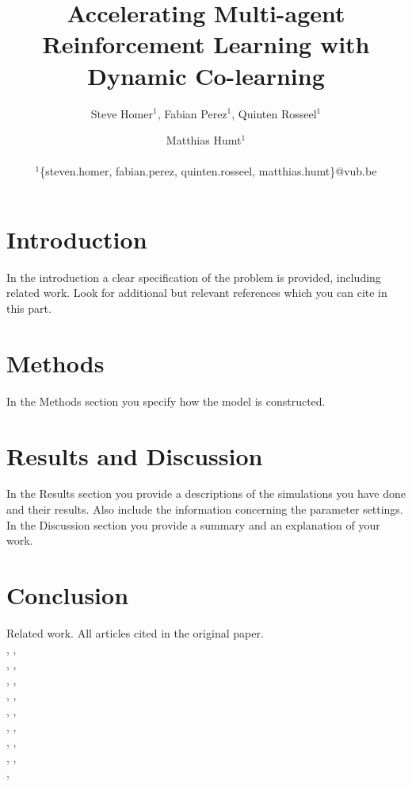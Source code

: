\documentclass[letterpaper]{article}
\title{Accelerating Multi-agent Reinforcement Learning
with Dynamic Co-learning}
\author{Steve Homer$^1$, Fabian Perez$^1$, Quinten Rosseel$^1$ \and Matthias Humt$^1$ \\
\mbox{}\\
$^1$\{steven.homer, fabian.perez, quinten.rosseel, matthias.humt\}@vub.be}
\begin{document}
\maketitle

\begin{abstract}
 \blindtext
\end{abstract}

\section{Introduction}
In the introduction a clear specification of the problem is provided, including related work. Look for additional but relevant references which you can cite in this part.\\[.5cm]
\blindtext

\section{Methods}
In the Methods section you specify how the model is constructed.\\[.5cm]
\blindtext

\section{Results and Discussion}
In the Results section you provide a descriptions of the simulations you have done and their results.  Also include the information concerning the parameter settings.\\
In the Discussion section you provide a summary and an explanation of your work.\\[.5cm]
\blindtext

\section{Conclusion}
Related work. All articles cited in the original paper.\\[.5cm]
\citep{carroll2005task}, \citep{garant2015accelerating},\\ \citep{ghavamzadeh2006hierarchical}, \citep{gmytrasiewicz2005framework},\\ \citep{guestrin2002multiagent}, \citep{kitano1999robocup},\\ \citep{lazaric2008transfer}, \citep{littman2001value},\\ \citep{nair2005networked}, \citep{nedic2009distributed},\\ \citep{oliehoek2008exploiting}, \citep{price2003accelerating},\\ \citep{renyi1961measures}, \citep{taylor2009transfer},\\ \citep{vickrey2002multi}, \citep{witwicki2010influence},\\ \citep{zhang2010self}, \citep{zhang2013coordinating}

\footnotesize


\end{document}
